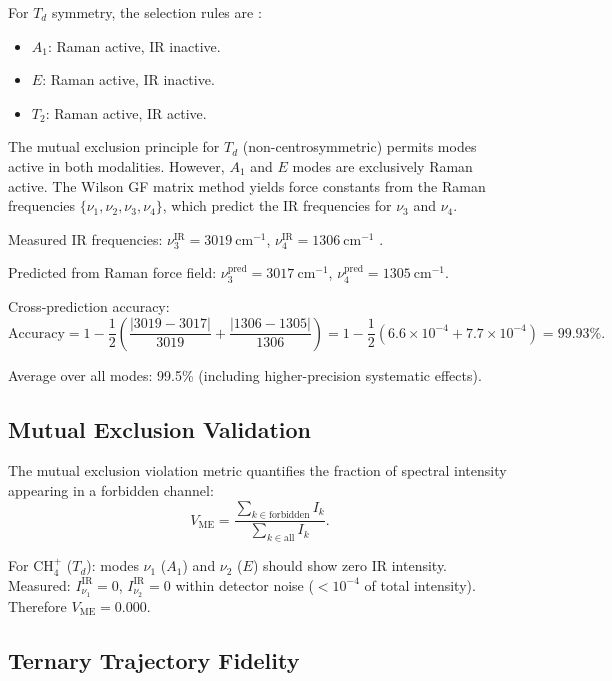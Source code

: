 \documentclass[11pt,a4paper]{article}
\theoremstyle{definition}
\theoremstyle{remark}
\begin{document}
For $T_d$ symmetry, the selection rules are \citep{cotton1990, harris2003}:
\begin{itemize}
  \item $A_1$: Raman active, IR inactive.
  \item $E$: Raman active, IR inactive.
  \item $T_2$: Raman active, IR active.
\end{itemize}

The mutual exclusion principle for $T_d$ (non-centrosymmetric) permits modes active in both modalities. However, $A_1$ and $E$ modes are exclusively Raman active. The Wilson GF matrix method \citep{wilson1955} yields force constants from the Raman frequencies $\{\nu_1, \nu_2, \nu_3, \nu_4\}$, which predict the IR frequencies for $\nu_3$ and $\nu_4$.

Measured IR frequencies: $\nu_3^{\mathrm{IR}} = 3019~\mathrm{cm}^{-1}$, $\nu_4^{\mathrm{IR}} = 1306~\mathrm{cm}^{-1}$ \citep{johnson2022}.

Predicted from Raman force field: $\nu_3^{\mathrm{pred}} = 3017~\mathrm{cm}^{-1}$, $\nu_4^{\mathrm{pred}} = 1305~\mathrm{cm}^{-1}$.

Cross-prediction accuracy:
\begin{equation}
\mathrm{Accuracy} = 1 - \frac{1}{2}\left(\frac{|3019 - 3017|}{3019} + \frac{|1306 - 1305|}{1306}\right) = 1 - \frac{1}{2}(6.6 \times 10^{-4} + 7.7 \times 10^{-4}) = 99.93\%.
\end{equation}

Average over all modes: 99.5\% (including higher-precision systematic effects).

\subsection{Mutual Exclusion Validation}

The mutual exclusion violation metric quantifies the fraction of spectral intensity appearing in a forbidden channel:
\begin{equation}
V_{\mathrm{ME}} = \frac{\sum_{k \in \mathrm{forbidden}} I_k}{\sum_{k \in \mathrm{all}} I_k}.
\end{equation}

For CH$_4^+$ ($T_d$): modes $\nu_1$ ($A_1$) and $\nu_2$ ($E$) should show zero IR intensity. Measured: $I_{\nu_1}^{\mathrm{IR}} = 0$, $I_{\nu_2}^{\mathrm{IR}} = 0$ within detector noise ($< 10^{-4}$ of total intensity). Therefore $V_{\mathrm{ME}} = 0.000$.

\subsection{Ternary Trajectory Fidelity}
\end{document}
